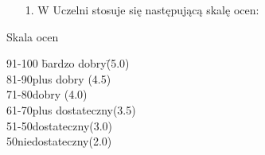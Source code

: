 \documentclass[a4paper,11pt]{article}
\begin{document}

\begin{itemize}
\item[1.] W Uczelni stosuje się następującą skalę ocen:
\end{itemize}


\begin{table}[ht]
\caption{Skala ocen}
\begin{tabbing}
91-100\hspace{5mm} \=bardzo dobry\hspace{10mm}\= (5.0) \\
81-90\>plus dobry\> (4.5)\\
71-80\>dobry\> (4.0) \\
61-70\>plus dostateczny\>(3.5)\\
51-50\>dostateczny\>(3.0)\\
50\>niedostateczny\>(2.0)\\
\end{tabbing}
\end{table}
\end{document}
